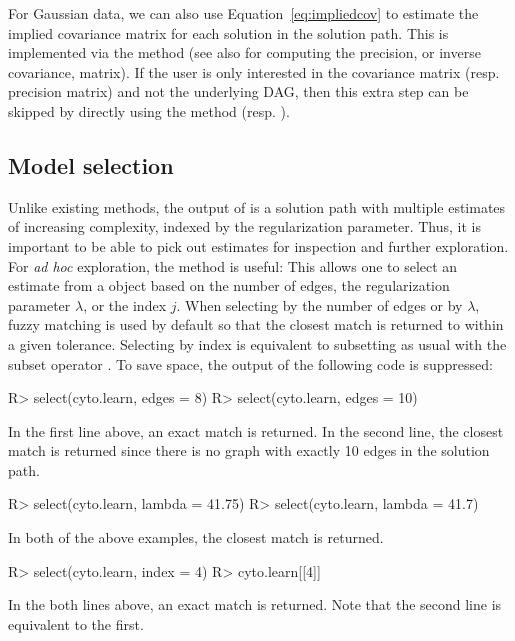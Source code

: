 \documentclass[article]{jss}
\renewcommand{\|}{\,|\,}
\begin{document}
For Gaussian data, we can also use Equation~\ref{eq:impliedcov} to estimate the implied covariance matrix for each solution in the solution path. This is implemented via the  method (see also  for computing the precision, or inverse covariance, matrix). If the user is only interested in the covariance matrix (resp. precision matrix) and not the underlying DAG, then this extra step can be skipped by directly using the  method (resp. ).

\subsection{Model selection}
\label{subsec:selection}

Unlike existing methods, the output of  is a solution path with multiple estimates of increasing complexity, indexed by the regularization parameter. 
Thus, it is important to be able to pick out estimates for inspection and further exploration.
For \emph{ad hoc} exploration, the  method is useful: This allows one to select an estimate from a  object based on the number of edges, the regularization parameter $\lambda$, or the index $j$. When selecting by the number of edges or by $\lambda$, fuzzy matching is used by default so that the closest match is returned to within a given tolerance. Selecting by index is equivalent to subsetting as usual with the subset operator \code{`[[`}. To save space, the output of the following code is suppressed:
%
\begin{CodeChunk}
\begin{CodeInput}
R> select(cyto.learn, edges = 8)  
R> select(cyto.learn, edges = 10) 
\end{CodeInput}
\end{CodeChunk}
%
In the first line above, an exact match is returned. In the second line, the closest match is returned since there is no graph with exactly 10 edges in the solution path.
%
\begin{CodeChunk}
\begin{CodeInput}
R> select(cyto.learn, lambda = 41.75)
R> select(cyto.learn, lambda = 41.7) 
\end{CodeInput}
\end{CodeChunk}
%
In both of the above examples, the closest match is returned. 
%
\begin{CodeChunk}
\begin{CodeInput}
R> select(cyto.learn, index = 4)
R> cyto.learn[[4]]              
\end{CodeInput}
\end{CodeChunk}
%
In the both lines above, an exact match is returned. Note that the second line is equivalent to the first.
\end{document}
